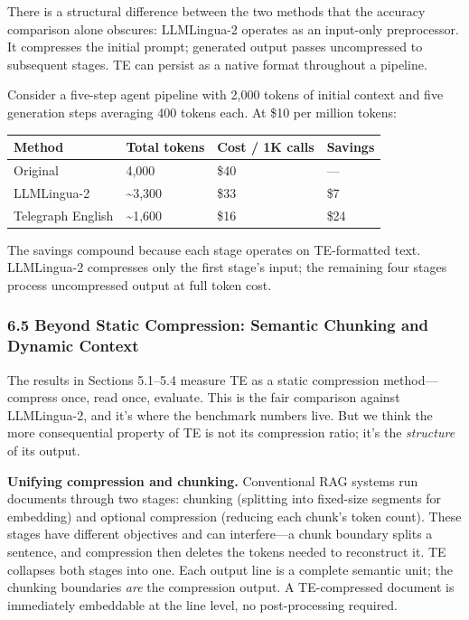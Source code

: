\documentclass[
]{article}
\newcounter{none} %
\begin{document}
There is a structural difference between the two methods that the
accuracy comparison alone obscures: LLMLingua-2 operates as an
input-only preprocessor. It compresses the initial prompt; generated
output passes uncompressed to subsequent stages. TE can persist as a
native format throughout a pipeline.

Consider a five-step agent pipeline with 2,000 tokens of initial context
and five generation steps averaging 400 tokens each. At \$10 per million
tokens:

{\def\LTcaptype{none} %
\begin{longtable}[]{@{}llll@{}}
\toprule\noalign{}
Method & Total tokens & Cost / 1K calls & Savings \\
\midrule\noalign{}
\endhead
\bottomrule\noalign{}
\endlastfoot
Original & 4,000 & \$40 & --- \\
LLMLingua-2 & \textasciitilde3,300 & \$33 & \$7 \\
Telegraph English & \textasciitilde1,600 & \$16 & \$24 \\
\end{longtable}
}

The savings compound because each stage operates on TE-formatted text.
LLMLingua-2 compresses only the first stage's input; the remaining four
stages process uncompressed output at full token cost.

\subsubsection{6.5 Beyond Static Compression: Semantic Chunking and
Dynamic
Context}\label{beyond-static-compression-semantic-chunking-and-dynamic-context}

The results in Sections 5.1--5.4 measure TE as a static compression
method---compress once, read once, evaluate. This is the fair comparison
against LLMLingua-2, and it's where the benchmark numbers live. But we
think the more consequential property of TE is not its compression
ratio; it's the \emph{structure} of its output.

\textbf{Unifying compression and chunking.} Conventional RAG systems run
documents through two stages: chunking (splitting into fixed-size
segments for embedding) and optional compression (reducing each chunk's
token count). These stages have different objectives and can
interfere---a chunk boundary splits a sentence, and compression then
deletes the tokens needed to reconstruct it. TE collapses both stages
into one. Each output line is a complete semantic unit; the chunking
boundaries \emph{are} the compression output. A TE-compressed document
is immediately embeddable at the line level, no post-processing
required.
\end{document}
